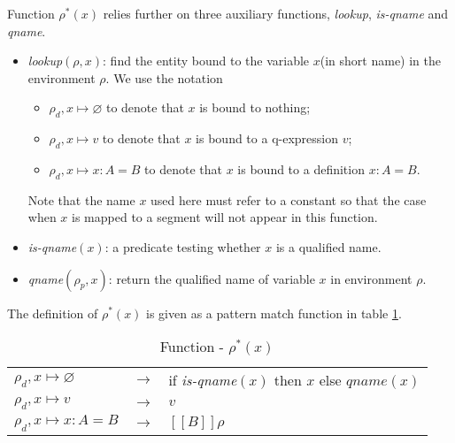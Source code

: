 Function $\rho^*(x)$ relies further on three auxiliary functions, \emph{lookup}, \emph{is-qname} and \emph{qname}.
\begin{itemize}
  \item \emph{lookup}$(\rho, x)$: find the entity bound to the variable $x$(in short name) in the environment $\rho$. We use the notation
    \begin{itemize}
    \item $\rho_{d}, x \mapsto \varnothing$ to denote that $x$ is bound to nothing;
    \item $\rho_{d}, x \mapsto v$ to denote that $x$ is bound to a q-expression $v$;
    \item $\rho_{d}, x \mapsto x : A = B$ to denote that $x$ is bound to a definition $x : A = B$.
    \end{itemize}
    Note that the name $x$ used here must refer to a constant so that the case when $x$ is mapped to a segment will not appear in this function.
  \item \emph{is-qname}$(x)$: a predicate testing whether $x$ is a qualified name.
  \item \emph{qname}$(\rho_{p}, x)$: return the qualified name of variable $x$ in environment $\rho$.
\end{itemize}
The definition of $\rho^*(x)$ is given as a pattern match function in table \ref{extension:tab:eval-const}.
\begin{table}[h]
  \centering
  \begin{tabular}{l l l}
    $\rho_{d}, x \mapsto \varnothing$ & $\rightarrow$ & if \emph{is-qname}$(x)$ then $x$ else $qname(x)$ \\
    $\rho_{d}, x \mapsto v$ & $\rightarrow$ & $v$ \\
    $\rho_{d}, x \mapsto x : A = B$ & $\rightarrow$ & $[\![B]\!]\rho$ \\
  \end{tabular}
  \caption{Function - $\rho^*(x)$}
  \label{extension:tab:eval-const}
\end{table}

